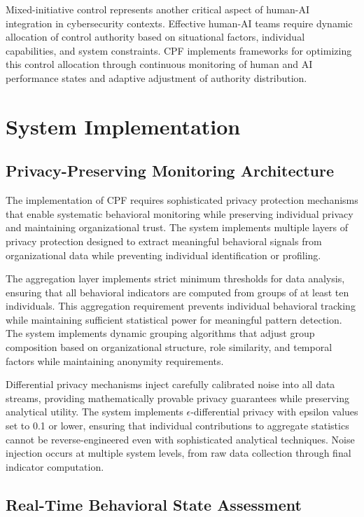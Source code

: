 \documentclass[journal]{IEEEtran}
\begin{document}
Mixed-initiative control represents another critical aspect of human-AI integration in cybersecurity contexts. Effective human-AI teams require dynamic allocation of control authority based on situational factors, individual capabilities, and system constraints. CPF implements frameworks for optimizing this control allocation through continuous monitoring of human and AI performance states and adaptive adjustment of authority distribution.

\section{System Implementation}

\subsection{Privacy-Preserving Monitoring Architecture}

The implementation of CPF requires sophisticated privacy protection mechanisms that enable systematic behavioral monitoring while preserving individual privacy and maintaining organizational trust. The system implements multiple layers of privacy protection designed to extract meaningful behavioral signals from organizational data while preventing individual identification or profiling.

The aggregation layer implements strict minimum thresholds for data analysis, ensuring that all behavioral indicators are computed from groups of at least ten individuals. This aggregation requirement prevents individual behavioral tracking while maintaining sufficient statistical power for meaningful pattern detection. The system implements dynamic grouping algorithms that adjust group composition based on organizational structure, role similarity, and temporal factors while maintaining anonymity requirements.

Differential privacy mechanisms inject carefully calibrated noise into all data streams, providing mathematically provable privacy guarantees while preserving analytical utility. The system implements $\epsilon$-differential privacy with epsilon values set to 0.1 or lower, ensuring that individual contributions to aggregate statistics cannot be reverse-engineered even with sophisticated analytical techniques. Noise injection occurs at multiple system levels, from raw data collection through final indicator computation.

\subsection{Real-Time Behavioral State Assessment}
\end{document}
